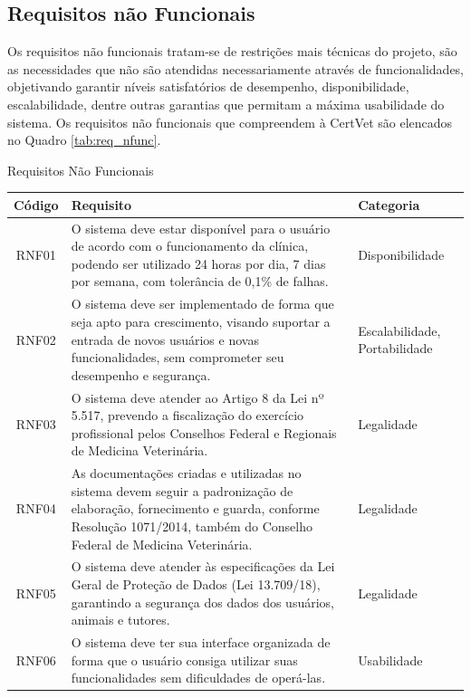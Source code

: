 \documentclass[
    12pt,               %
    openright,          %
    oneside,
    a4paper,            %
    BIBLATEX,           %
    TODO,               %
    english,            %
    brazil              %
    ]{ifsp-spo-inf-ctds}
\begin{document}
        \subsection{Requisitos não Funcionais}

            Os requisitos não funcionais tratam-se de restrições mais técnicas do projeto, são as necessidades que não são atendidas necessariamente através de funcionalidades, objetivando garantir níveis satisfatórios  de desempenho, disponibilidade, escalabilidade, dentre outras garantias que permitam a máxima usabilidade do sistema. Os requisitos não funcionais que compreendem à CertVet são elencados no Quadro \ref{tab:req_nfunc}.

            \begin{center}
                \begin{quadro}[h]
                  \caption{Requisitos Não Funcionais}
                \begin{tabulary}{1.0\textwidth}{|C|p{25em}|p{7em}|}
                \hline
                Código & Requisito & Categoria\\
                \hline
                RNF01 & O sistema deve estar disponível para o usuário de acordo com o funcionamento da clínica, podendo ser utilizado 24 horas por dia, 7 dias por semana, com tolerância de 0,1\% de falhas. & Disponibilidade\\
                \hline
                RNF02 & O sistema deve ser implementado de forma que seja apto para crescimento, visando suportar a entrada de novos usuários e novas funcionalidades, sem comprometer seu desempenho e segurança. & Escalabilidade, Portabilidade\\
                \hline
                RNF03 & O sistema deve atender ao Artigo 8 da Lei nº 5.517, prevendo a fiscalização do exercício profissional pelos Conselhos Federal e Regionais de Medicina Veterinária. & Legalidade\\
                \hline
                RNF04 & As documentações criadas e utilizadas no sistema devem seguir a padronização de elaboração, fornecimento e guarda, conforme Resolução 1071/2014, também do Conselho Federal de Medicina Veterinária. & Legalidade\\
                \hline
                RNF05 & O sistema deve atender às especificações da Lei Geral de Proteção de Dados (Lei 13.709/18), garantindo a segurança dos dados dos usuários, animais e tutores. & Legalidade\\
                \hline
                RNF06 & O sistema deve ter sua interface organizada de forma que o usuário consiga utilizar suas funcionalidades sem dificuldades de operá-las. & Usabilidade\\

\end{tabulary}
\end{quadro}
\end{center}
\end{document}
